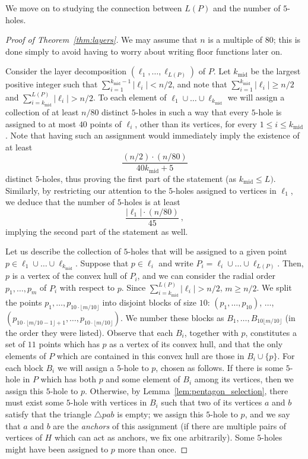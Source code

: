 \documentclass[12pt,reqno, a4paper]{amsart}
\begin{document}
We move on to studying the connection between $L(P)$ and the number of $5$-holes.
\begin{proof}[Proof of Theorem~\ref{thm:layers}]
    We may assume that $n$ is a multiple of $80$; this is done simply to avoid having to worry about writing floor functions later on. 
    
    Consider the layer decomposition $(\ell_1,\dots,\ell_{L(P)})$ of $P$. Let $k_{\operatorname{mid}}$ be the largest positive integer such that $\sum_{i=1}^{k_{\operatorname{mid}}-1}|\ell_i|< n/2$, and note that $\sum_{i=1}^{k_{\operatorname{mid}}}|\ell_i|\geq  n/2$ and $\sum_{i=k_{\operatorname{mid}}}^{L(P)}|\ell_i|> n/2$. To each element of $\ell_1\cup\dots\cup\ell_{k_{\operatorname{mid}}}$ we will assign a collection of at least $ n/80$ distinct $5$-holes in such a way that every $5$-hole is assigned to at most $40$ points of $\ell_i$, other than its vertices, for every $1\leq i\leq k_{\operatorname{mid}}$. Note that having such an assignment would immediately imply the existence of at least \[\frac{(n/2)\cdot (n/80)}{40k_{\operatorname{mid}}+5}\] distinct $5$-holes, thus proving the first part of the statement (as $k_{\operatorname{mid}}\leq L)$. Similarly, by restricting our attention to the $5$-holes assigned to vertices in $\ell_1$, we deduce that the number of $5$-holes is at least \[\frac{|\ell_1|\cdot( n/80)}{45}\,,\] implying the second part of the statement as well.
    
    Let us describe the collection of $5$-holes that will be assigned to a given point $p\in \ell_1\cup\dots\cup\ell_{k_{\operatorname{mid}}}$. Suppose that $p\in \ell_i$ and write $P_i=\ell_i\cup\dots\cup\ell_{L(P)}$. Then, $p$ is a vertex of the convex hull of $P_i$, and we can consider the radial order $p_1,\dots,p_m$ of $P_i$ with respect to $p$. Since $\sum_{i=k_{\operatorname{mid}}}^{L(P)}|\ell_i|> n/2$, $m\geq n/2$. We split the points $p_1,\dots,p_{10\cdot\lfloor m/10\rfloor}$ into disjoint blocks of size $10$: $(p_1,\dots,p_{10})$, $\dots$, $(p_{10\cdot\lfloor m/10-1\rfloor+1},\dots, p_{10\cdot\lfloor m/10\rfloor})$. We number these blocks as $B_1,\dots,B_{10\lfloor m/10\rfloor}$ (in the order they were listed). Observe that each $B_i$, together with $p$, constitutes a set of $11$ points which has $p$ as a vertex of its convex hull, and that the only elements of $P$ which are contained in this convex hull are those in $B_{i}\cup\{p\}$. For each block $B_i$ we will assign a $5$-hole to $p$, chosen as follows. If there is some $5$-hole in $P$ which has both $p$ and some element of $B_i$ among its vertices, then we assign this $5$-hole to $p$. Otherwise, by Lemma~\ref{lem:pentagon_selection}, there must exist some $5$-hole with vertices in $B_i$ such that two of its vertices $a$ and $b$ satisfy that the triangle $\triangle pab$ is empty; we assign this $5$-hole to $p$, and we say that $a$ and $b$ are the \textit{anchors} of this assignment (if there are multiple pairs of vertices of $H$ which can act as anchors, we fix one arbitrarily). Some $5$-holes might have been assigned to $p$ more than once.


\end{proof}
\end{document}
